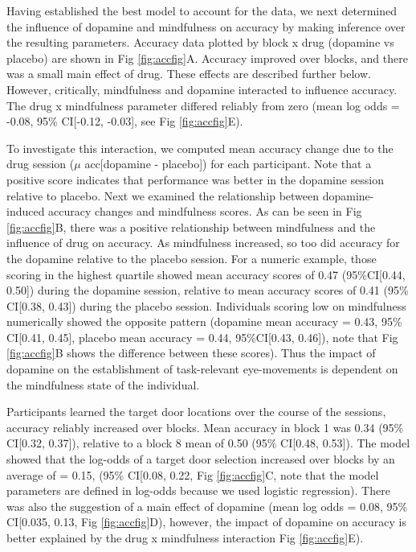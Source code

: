 \documentclass{article}
\begin{document}
Having established the best model to account for the data, we next
determined the influence of dopamine and mindfulness on accuracy by
making inference over the resulting parameters. Accuracy data plotted by
block x drug (dopamine vs placebo) are shown in Fig \ref{fig:accfig}A.
Accuracy improved over blocks, and there was a small main effect of
drug. These effects are described further below. However, critically,
mindfulness and dopamine interacted to influence accuracy. The drug x
mindfulness parameter differed reliably from zero (mean log odds =
-0.08, 95\% CI{[}-0.12, -0.03{]}, see Fig \ref{fig:accfig}E).

To investigate this interaction, we computed mean accuracy change due to
the drug session (\(\mu\) acc{[}dopamine - placebo{]}) for each
participant. Note that a positive score indicates that performance was
better in the dopamine session relative to placebo. Next we examined the
relationship between dopamine-induced accuracy changes and mindfulness
scores. As can be seen in Fig \ref{fig:accfig}B, there was a positive
relationship between mindfulness and the influence of drug on accuracy.
As mindfulness increased, so too did accuracy for the dopamine relative
to the placebo session. For a numeric example, those scoring in the
highest quartile showed mean accuracy scores of 0.47 (95\%CI{[}0.44,
0.50{]}) during the dopamine session, relative to mean accuracy scores
of 0.41 (95\% CI{[}0.38, 0.43{]}) during the placebo session.
Individuals scoring low on mindfulness numerically showed the opposite
pattern (dopamine mean accuracy = 0.43, 95\% CI{[}0.41, 0.45{]}, placebo
mean accuracy = 0.44, 95\%CI{[}0.43, 0.46{]}), note that Fig
\ref{fig:accfig}B shows the difference between these scores). Thus the
impact of dopamine on the establishment of task-relevant eye-movements
is dependent on the mindfulness state of the individual.

Participants learned the target door locations over the course of the
sessions, accuracy reliably increased over blocks. Mean accuracy in
block 1 was 0.34 (95\% CI{[}0.32, 0.37{]}), relative to a block 8 mean
of 0.50 (95\% CI{[}0.48, 0.53{]}). The model showed that the log-odds of
a target door selection increased over blocks by an average of = 0.15,
(95\% CI{[}0.08, 0.22, Fig \ref{fig:accfig}C, note that the model
parameters are defined in log-odds because we used logistic regression).
There was also the suggestion of a main effect of dopamine (mean log
odds = 0.08, 95\% CI{[}0.035, 0.13, Fig \ref{fig:accfig}D), however, the
impact of dopamine on accuracy is better explained by the drug x
mindfulness interaction Fig \ref{fig:accfig}E).
\end{document}
